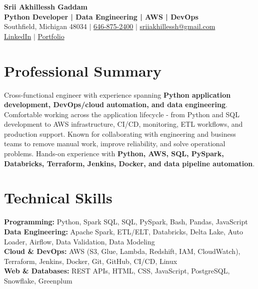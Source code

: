\documentclass[letterpaper,10pt]{article}
\begin{document}
\fontsize{9.35pt}{10.45pt}\selectfont

\begin{center}
    {\LARGE \textbf{Srii Akhillessh Gaddam}} \\[-1pt]
    \textbf{Python Developer | Data Engineering | AWS | DevOps} \\[2pt]
    Southfield, Michigan 48034 $|$
    \href{tel:6468752400}{646-875-2400} $|$
    \href{mailto:sriiakhillessh@gmail.com}{sriiakhillessh@gmail.com} \\[1pt]
    \href{https://www.linkedin.com/in/srii-akhiilessh-gaddam-b48668191/}{LinkedIn} $|$
    \href{https://sriiakhillesshg.github.io/portfolio/}{Portfolio}
\end{center}
\vspace{-8pt}

\section{Professional Summary}
\small{Cross-functional engineer with experience spanning \textbf{Python application development, DevOps/cloud automation, and data engineering}. Comfortable working across the application lifecycle - from Python and SQL development to AWS infrastructure, CI/CD, monitoring, ETL workflows, and production support. Known for collaborating with engineering and business teams to remove manual work, improve reliability, and solve operational problems. Hands-on experience with \textbf{Python, AWS, SQL, PySpark, Databricks, Terraform, Jenkins, Docker, and data pipeline automation}.}

\section{Technical Skills}
\small{
\textbf{Programming:} Python, Spark SQL, SQL, PySpark, Bash, Pandas, JavaScript \\
\textbf{Data Engineering:} Apache Spark, ETL/ELT, Databricks, Delta Lake, Auto Loader, Airflow, Data Validation, Data Modeling \\
\textbf{Cloud \& DevOps:} AWS (S3, Glue, Lambda, Redshift, IAM, CloudWatch), Terraform, Jenkins, Docker, Git, GitHub, CI/CD, Linux \\
\textbf{Web \& Databases:} REST APIs, HTML, CSS, JavaScript, PostgreSQL, Snowflake, Greenplum
}
\end{document}
